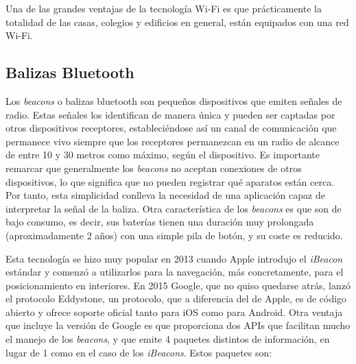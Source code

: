 Una de las grandes ventajas de la tecnología Wi-Fi es que prácticamente la totalidad de las casas, colegios y edificios en general, están equipados con una red Wi-Fi.



\subsection{Balizas Bluetooth}

Los \textit{beacons} o balizas bluetooth son pequeños dispositivos que emiten señales de radio. Estas señales los identifican de manera única y pueden ser captadas por otros dispositivos receptores, estableciéndose así un canal de comunicación que permanece vivo siempre que los receptores permanezcan en un radio de alcance de entre 10 y 30 metros como máximo, según el dispositivo. Es importante remarcar que generalmente los \textit{beacons} no aceptan conexiones de otros dispositivos, lo que significa que no pueden registrar qué aparatos están cerca. Por tanto, esta simplicidad conlleva la necesidad de una aplicación capaz de interpretar la señal de la baliza. Otra característica de los \textit{beacons} es que son de bajo consumo, es decir, sus baterías tienen una duración muy prolongada (aproximadamente 2 años) con una simple pila de botón, y su coste es reducido.

Esta tecnología se hizo muy popular en 2013 cuando Apple introdujo el \textit{iBeacon} estándar y comenzó a utilizarlos para la navegación, más concretamente, para el posicionamiento en interiores. En 2015 Google, que no quiso quedarse atrás, lanzó el protocolo Eddystone, un protocolo, que a diferencia del de Apple, es de código abierto y ofrece soporte oficial tanto para iOS como para Android. Otra ventaja que incluye la versión de Google es que proporciona dos APIs que facilitan mucho el manejo de los \textit{beacons}, y que emite 4 paquetes distintos de información, en lugar de 1 como en el caso de los \textit{iBeacons}. Estos paquetes son:

